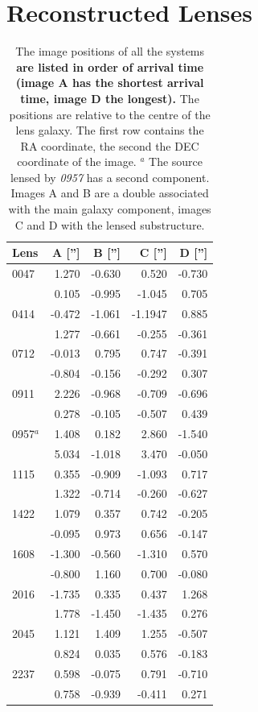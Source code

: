 \documentclass[useAMS,usenatbib]{mn2e}
\newcommand{\cb}[1]{{\color{red} \textbf{#1}}}
\begin{document}
\appendix
\section{Reconstructed Lenses}\label{sec:reconstructions}
\begin{table}
  \begin{center}
    \begin{tabular}{l r r r r}
      Lens & A [''] & B [''] & C [''] & D [''] \\ \hline
      0047 & 1.270 & -0.630 & 0.520 & -0.730 \\
           & 0.105 & -0.995 & -1.045 & 0.705 \\
      0414 & -0.472 & -1.061 & -1.1947 & 0.885 \\
           & 1.277 & -0.661 & -0.255 & -0.361 \\
      0712 & -0.013 & 0.795 & 0.747 & -0.391 \\
           & -0.804 & -0.156 & -0.292 & 0.307 \\
      0911 & 2.226 & -0.968 & -0.709 & -0.696 \\
           & 0.278 & -0.105 & -0.507 & 0.439 \\
      0957$^{a}$ & 1.408 & 0.182 & 2.860 & -1.540 \\
           & 5.034 & -1.018 & 3.470 & -0.050 \\
      1115 & 0.355 & -0.909 & -1.093 & 0.717 \\
           & 1.322 & -0.714 & -0.260 & -0.627 \\
      1422 & 1.079 & 0.357 & 0.742 & -0.205 \\
           & -0.095 & 0.973 & 0.656 & -0.147 \\
      1608 & -1.300 & -0.560 & -1.310 & 0.570 \\
           & -0.800 & 1.160 & 0.700 & -0.080 \\
      2016 & -1.735 & 0.335 & 0.437 & 1.268 \\
           & 1.778 & -1.450 & -1.435 & 0.276 \\
      2045 & 1.121 & 1.409 & 1.255 & -0.507 \\
           & 0.824 & 0.035 & 0.576 & -0.183 \\
      2237 & 0.598 & -0.075 & 0.791 & -0.710 \\
           & 0.758 & -0.939 & -0.411 & 0.271 \\
    \end{tabular}
    \caption[width=\linewidth]{The image positions of all the systems \cb{are listed in order of arrival time (image A has the shortest arrival time, image D the longest).} The positions are relative to the centre of the lens galaxy. The first row contains the RA coordinate, the second the DEC coordinate of the image. \newline $^{a}$ The source lensed by {\it0957} has a second component. Images A and B are a double associated with the main galaxy component, images C and D with the lensed substructure.}
    \label{tab:lenspositions}
  \end{center}
\end{table}
\end{document}
